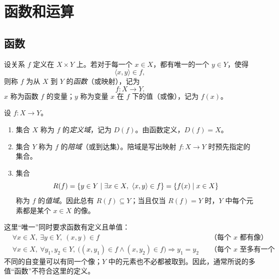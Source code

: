 %
%

\chapter{函数和运算}

\section{函数}

\begin{definition}[函数]\label{function-definition}
  设关系 $f$ 定义在 $X\times Y$ 上。若对于每一个 $x\in X$，都有唯一的一个 $y\in Y$，使得
  \[
  \langle x,y\rangle\in f,
  \]
  则称 $f$ 为从 $X$ 到 $Y$ 的\emph{函数}（或映射），记为
  \[
  f:X\to Y.
  \]
  $x$ 称为函数 $f$ 的变量；$y$ 称为变量 $x$ 在 $f$ 下的值（或像），记为 $f(x)$。
\end{definition}

\begin{definition}\label{domain-codomain-range}
  设 $f:X\to Y$。
  \begin{enumerate}
    \item 集合 $X$ 称为 $f$ 的\emph{定义域}，记为 $D(f)$。由函数定义，$D(f)=X$。
    \item 集合 $Y$ 称为 $f$ 的\emph{陪域}（或到达集）。陪域是写出映射 $f:X\to Y$ 时预先指定的集合。
    \item 集合
    \[
    R(f)=\{y\in Y\mid \exists x\in X,\ \langle x,y\rangle\in f\}
    =\{f(x)\mid x\in X\}
    \]
    称为 $f$ 的\emph{值域}。因此总有 $R(f)\subseteq Y$；当且仅当 $R(f)=Y$ 时，$Y$ 中每个元素都是某个 $x\in X$ 的像。
  \end{enumerate}
\end{definition}

这里“唯一”同时要求函数有定义且单值：
\[
\begin{aligned}
&\forall x\in X,\ \exists y\in Y,\ (x,y)\in f
&&\text{（每个 $x$ 都有像）},\\
&\forall x\in X,\ \forall y_1,y_2\in Y,\
\bigl((x,y_1)\in f\land(x,y_2)\in f\bigr)\Rightarrow y_1=y_2
&&\text{（每个 $x$ 至多有一个像）}.
\end{aligned}
\]
不同的自变量可以有同一个像；$Y$ 中的元素也不必都被取到。因此，通常所说的多值“函数”不符合这里的定义。

